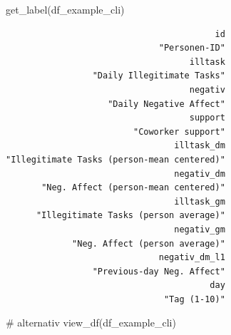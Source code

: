 \documentclass[
  letterpaper,
  DIV=11,
  numbers=noendperiod]{scrreprt}
\newenvironment{Shaded}{\begin{snugshade}}{\end{snugshade}}
\newcommand{\CommentTok}[1]{\textcolor[rgb]{0.37,0.37,0.37}{#1}}
\newcommand{\FunctionTok}[1]{\textcolor[rgb]{0.28,0.35,0.67}{#1}}
\newcommand{\NormalTok}[1]{\textcolor[rgb]{0.00,0.23,0.31}{#1}}
\begin{document}
\begin{Shaded}
\begin{Highlighting}[]
\FunctionTok{get\_label}\NormalTok{(df\_example\_cli)}
\end{Highlighting}
\end{Shaded}

\begin{verbatim}
                                         id 
                              "Personen-ID" 
                                    illtask 
                 "Daily Illegitimate Tasks" 
                                    negativ 
                    "Daily Negative Affect" 
                                    support 
                         "Coworker support" 
                                 illtask_dm 
"Illegitimate Tasks (person-mean centered)" 
                                 negativ_dm 
       "Neg. Affect (person-mean centered)" 
                                 illtask_gm 
      "Illegitimate Tasks (person average)" 
                                 negativ_gm 
             "Neg. Affect (person average)" 
                              negativ_dm_l1 
                 "Previous-day Neg. Affect" 
                                        day 
                               "Tag (1-10)" 
\end{verbatim}

\begin{Shaded}
\begin{Highlighting}[]
\CommentTok{\# alternativ}
\FunctionTok{view\_df}\NormalTok{(df\_example\_cli)}
\end{Highlighting}
\end{Shaded}
\end{document}

